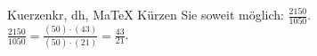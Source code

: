 \begin{MAufgabe}{Kuerzen}{kr, dh, MaTeX}
K\"urzen Sie soweit m\"oglich: $\frac{2150}{1050}$.\\ 
\ifLsg\MLoesung
\quad $\frac{2150}{1050}=\frac{(50)\cdot(43)}{(50)\cdot(21)}=\frac{43}{21}$.\else\relax\fi
 \end{MAufgabe}